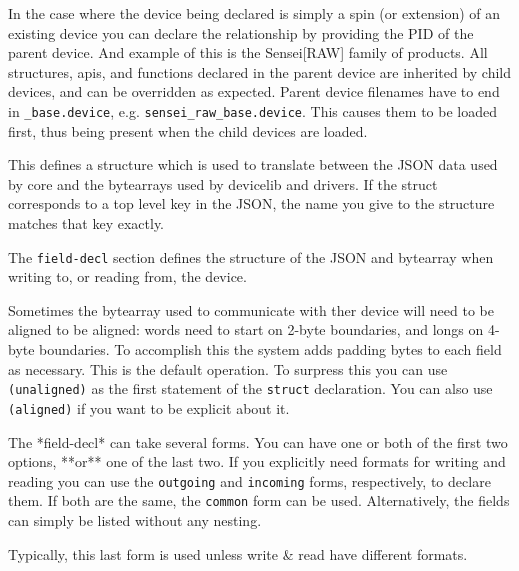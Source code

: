 \documentclass[12pt]{article}
\begin{document}

In the case where the device being declared is simply a spin (or
extension) of an existing device you can declare the relationship by
providing the PID of the parent device. And example of this is the
Sensei[RAW] family of products. All structures, apis, and functions
declared in the parent device are inherited by child devices, and can
be overridden as expected. Parent device filenames have to end in
\verb|_base.device|, e.g. \verb|sensei_raw_base.device|. This causes
them to be loaded first, thus being present when the child devices are
loaded.


This defines a structure which is used to translate between the JSON
data used by core and the bytearrays used by devicelib and drivers. If
the struct corresponds to a top level key in the JSON, the name you
give to the structure matches that key exactly.

The \verb|field-decl| section defines the structure of the JSON and
bytearray when writing to, or reading from, the device.


Sometimes the bytearray used to communicate with ther device will need
to be aligned to be aligned: words need to start on 2-byte boundaries,
and longs on 4-byte boundaries. To accomplish this the system adds
padding bytes to each field as necessary. This is the default
operation. To surpress this you can use \verb|(unaligned)| as the
first statement of the \verb|struct| declaration. You can also use
\verb|(aligned)| if you want to be explicit about it.



The *field-decl* can take several forms. You can have one or both of
the first two options, **or** one of the last two. If you explicitly
need formats for writing and reading you can use the \verb|outgoing|
and \verb|incoming| forms, respectively, to declare them. If both are
the same, the \verb|common| form can be used. Alternatively, the
fields can simply be listed without any nesting.

Typically, this last form is used unless write & read have different
formats.
\end{document}
